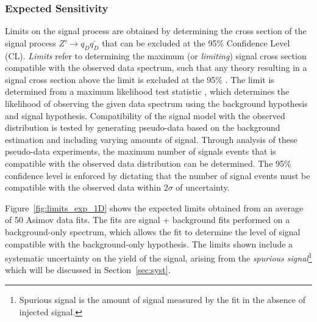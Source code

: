 \begin{figure}[!htbp]
{%
    \label{fig:siginj_asimov}}
\end{figure}

\clearpage
\subsubsection{Expected Sensitivity}
\label{subsec:fit_expsens}

Limits on the signal process are obtained by determining the cross section of the signal process $Z'\rightarrow q_D \bar{q_D}$ that can be excluded at the 95\% Confidence Level (CL). 
\textit{Limits} refer to determining the maximum (or \textit{limiting}) signal cross section compatible with the observed data spectrum, such that any theory resulting in a signal cross section above the limit is excluded at the 95\% . 
The limit is determined from a maximum likelihood test statistic \cite{likelihood}, which determines the likelihood of observing the given data spectrum using the background hypothesis and signal hypothesis.
Compatibility of the signal model with the observed distribution is tested by generating pseudo-data based on the background estimation and including varying amounts of signal.
Through analysis of these pseudo-data experiments, the maximum number of signals events that is compatible with the observed data distribution can be determined.
The 95\% confidence level is enforced by dictating that the number of signal events must be compatible with the observed data within 2$\sigma$ of uncertainty.

Figure~\ref{fig:limits_exp_1D} shows the expected limits obtained from an average of 50 Asimov data fits. 
The fits are signal + background fits performed on a background-only spectrum, which allows the fit to determine the level of signal compatible with the background-only hypothesis.
The limits shown include a systematic uncertainty on the yield of the signal, arising from the \textit{spurious signal}\footnote{Spurious signal is the amount of signal measured by the fit in the absence of injected signal.} which will be discussed in Section~\ref{sec:syst}.

